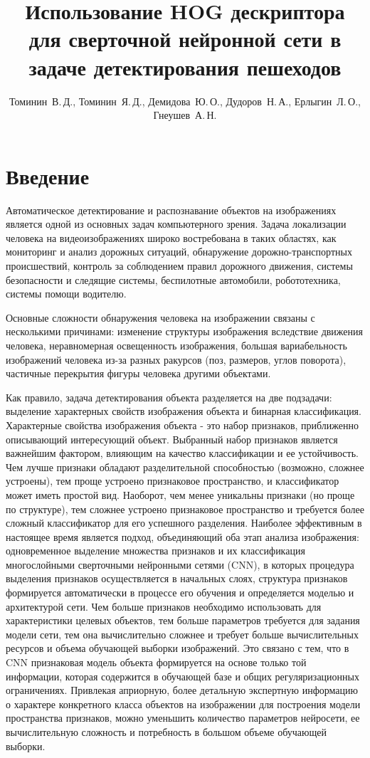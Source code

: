 \documentclass[12pt,twoside]{article}
\title
    [HOG дескриптор для сверточной нейронной сети в задаче детектирования пешеходов] %
	{Использование HOG дескриптора для сверточной нейронной сети в задаче детектирования пешеходов}
\author
    [Томинин~В.\,Д., Томинин~Я.\,Д., Демидова~Ю.\,О., Дудоров~Н.\,А., Ерлыгин~Л.\,О.] %
    {Томинин~В.\,Д., Томинин~Я.\,Д., Демидова~Ю.\,О., Дудоров~Н.\,А., Ерлыгин~Л.\,О., Гнеушев~А.\,Н.} %
    [Томинин$^1$~В.\,Д., Томинин$^1$~Я.\,Д., Демидова$^1$~Ю.\,О., Дудоров$^1$~Н.\,А., Ерлыгин$^1$~Л.\,О., Гнеушев$^{1,2}$~А.\,Н.] %
\begin{document}
\maketitle
\section{Введение}
Автоматическое детектирование и распознавание объектов на изображениях является одной из основных задач компьютерного зрения. 
Задача локализации человека на видеоизображениях широко востребована в таких областях, как мониторинг и анализ дорожных ситуаций, обнаружение дорожно-транспортных происшествий, контроль за соблюдением правил дорожного движения, системы безопасности и следящие системы, беспилотные автомобили, робототехника, системы помощи водителю.

Основные сложности обнаружения человека на изображении связаны с несколькими причинами: изменение структуры изображения вследствие движения человека, неравномерная освещенность изображения, большая вариабельность изображений человека из-за разных ракурсов (поз, размеров, углов поворота), частичные перекрытия фигуры человека другими объектами.

Как правило, задача детектирования объекта разделяется на две подзадачи: выделение характерных свойств изображения объекта и бинарная классификация. Характерные свойства изображения объекта - это набор признаков, приближенно описывающий интересующий объект. Выбранный набор признаков является важнейшим фактором, влияющим на качество классификации и ее устойчивость. Чем лучше признаки обладают разделительной способностью (возможно, сложнее устроены), тем проще устроено признаковое пространство, и классификатор может иметь простой вид. Наоборот, чем менее уникальны признаки (но проще по структуре), тем сложнее устроено признаковое пространство и требуется более сложный классификатор для его успешного разделения. Наиболее эффективным в настоящее время является подход, объединяющий оба этап анализа изображения: одновременное выделение множества  признаков и их классификация многослойными сверточными нейронными сетями (CNN), в которых процедура выделения признаков осуществляется в начальных слоях, структура признаков формируется автоматически в процессе его обучения и определяется моделью и архитектурой сети. Чем больше признаков необходимо использовать для характеристики целевых объектов, тем больше параметров требуется для задания модели сети, тем она вычислительно сложнее и требует больше вычислительных ресурсов и объема обучающей выборки изображений. Это связано с тем, что в CNN признаковая модель объекта формируется на основе только той информации, которая содержится в обучающей базе и общих регуляризационных ограничениях. Привлекая априорную, более детальную экспертную информацию о характере конкретного класса объектов на изображении для построения модели пространства признаков, можно уменьшить количество параметров нейросети, ее вычислительную сложность и потребность в большом  объеме обучающей выборки.
\end{document}

